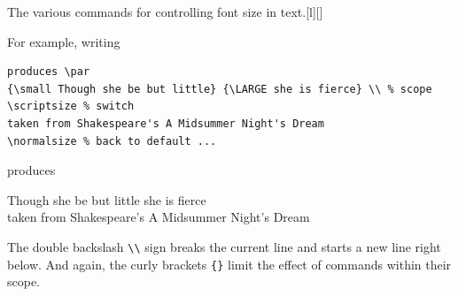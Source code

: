\begin{table}[ht!]
\begin{captionbeside}[test]{The various commands for controlling font size in text.\footnotemark}[l][\textwidth]{
}
\end{captionbeside}
\label{tab:fontsize}
\end{table}%
%
For example, writing
\begin{lstlisting}
produces \par
{\small Though she be but little} {\LARGE she is fierce} \\ % scope
\scriptsize % switch
taken from Shakespeare's A Midsummer Night's Dream
\normalsize % back to default ...
\end{lstlisting}
produces \par
{\small Though she be but little} {\LARGE she is fierce} \\
\scriptsize
taken from Shakespeare's A Midsummer Night's Dream
\normalsize \par
The double backslash \texttt{\textbackslash \textbackslash}\index{\texttt{\textbackslash \textbackslash}} sign breaks the current line and starts a new line right below. And again, the curly brackets \verb|{}|\index{\texttt{\{\}}} limit the effect of commands within their scope.

